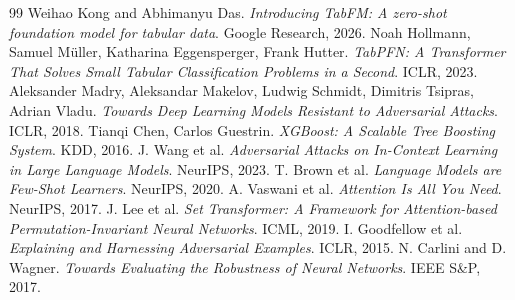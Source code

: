 \documentclass[conference]{IEEEtran}
\begin{document}
\newpage

\begin{thebibliography}{99}
 Weihao Kong and Abhimanyu Das. \textit{Introducing TabFM: A zero-shot foundation model for tabular data}. Google Research, 2026.
 Noah Hollmann, Samuel Müller, Katharina Eggensperger, Frank Hutter. \textit{TabPFN: A Transformer That Solves Small Tabular Classification Problems in a Second}. ICLR, 2023.
 Aleksander Madry, Aleksandar Makelov, Ludwig Schmidt, Dimitris Tsipras, Adrian Vladu. \textit{Towards Deep Learning Models Resistant to Adversarial Attacks}. ICLR, 2018.
 Tianqi Chen, Carlos Guestrin. \textit{XGBoost: A Scalable Tree Boosting System}. KDD, 2016.
 J. Wang et al. \textit{Adversarial Attacks on In-Context Learning in Large Language Models}. NeurIPS, 2023.
 T. Brown et al. \textit{Language Models are Few-Shot Learners}. NeurIPS, 2020.
 A. Vaswani et al. \textit{Attention Is All You Need}. NeurIPS, 2017.
 J. Lee et al. \textit{Set Transformer: A Framework for Attention-based Permutation-Invariant Neural Networks}. ICML, 2019.
 I. Goodfellow et al. \textit{Explaining and Harnessing Adversarial Examples}. ICLR, 2015.
 N. Carlini and D. Wagner. \textit{Towards Evaluating the Robustness of Neural Networks}. IEEE S\&P, 2017.
\end{thebibliography}

\newpage
\appendix

\end{document}
